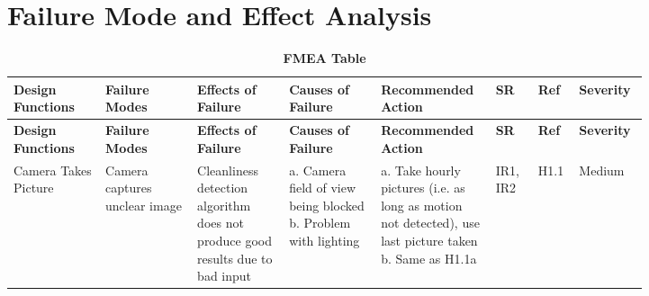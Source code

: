 \documentclass{article}
\begin{document}
\newpage


\section{Failure Mode and Effect Analysis}

\begin{longtable}{|>{\raggedright\arraybackslash}p{0.13\linewidth} | >{\raggedright\arraybackslash}p{0.13\linewidth} | >{\raggedright\arraybackslash}p{0.13\linewidth}| >{\raggedright\arraybackslash}p{0.13\linewidth}| >{\raggedright\arraybackslash}p{0.13\linewidth}| >{\raggedright\arraybackslash}p{0.06\linewidth}| >{\raggedright\arraybackslash}p{0.04\linewidth}| >{\raggedright\arraybackslash}p{0.07\linewidth}|}
    \caption{\bf FMEA Table} \label{tab:my_label} \\
    
    \hline
    \textbf{Design Functions} & \textbf{Failure Modes} & \textbf{Effects of Failure} & \textbf{Causes of Failure} & \textbf{Recommended Action} & \textbf{SR} & \textbf{Ref} & \textbf{Severity}\\
    \hline
    \endfirsthead
    
    \hline
    \textbf{Design Functions} & \textbf{Failure Modes} & \textbf{Effects of Failure} & \textbf{Causes of Failure} & \textbf{Recommended Action} & \textbf{SR} & \textbf{Ref} & \textbf{Severity}\\
    \hline
    \endhead
    
    \hline
    \endfoot
    
    \hline
    \endlastfoot


    \hline
    Camera Takes Picture & Camera captures unclear image \newline & Cleanliness detection algorithm does not produce good results due to bad input\newline & a. Camera field of view being blocked \newline b. Problem with lighting  \newline & a. Take hourly pictures (i.e. as long as motion not detected), use last picture taken \newline b. Same as H1.1a  \newline & IR1, \newline IR2 \newline & H1.1  \newline & Medium\\
    

\end{longtable}
\end{document}

